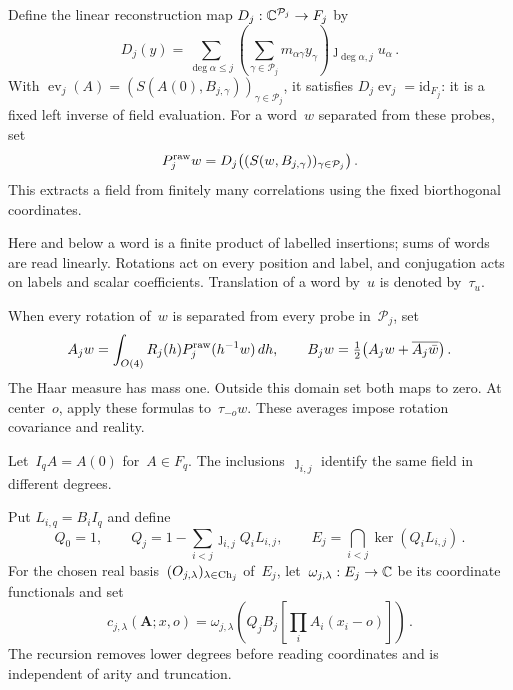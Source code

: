 \begin{definition}\label{def:D31}
Define the linear reconstruction map $D_j:\mathbb{C}^{\mathcal P_j}\to F_j$ by
\begin{equation*}
D_j(y)=\sum_{\deg\alpha\le j}\left(\sum_{\gamma\in\mathcal P_j}m_{\alpha\gamma}y_\gamma\right)\jmath_{\deg\alpha,j}u_\alpha\,.
\end{equation*}
With $\operatorname{ev}_j(A)=(S(A(0),B_{j,\gamma}))_{\gamma\in\mathcal P_j}$, it satisfies $D_j\operatorname{ev}_j=\mathrm{id}_{F_j}$: it is a fixed left inverse of field evaluation.
For a word~$w$ separated from these probes, set
\begin{equation*}
P_j^{\rm raw}w=D_j\big((S(w,B_{j,\gamma}))_{\gamma\in\mathcal P_j}\big)\,.
\end{equation*}
This extracts a field from finitely many correlations using the fixed biorthogonal coordinates.
\end{definition}

Here and below a word is a finite product of labelled insertions; sums of words are read linearly. Rotations act on every position and label, and conjugation acts on labels and scalar coefficients. Translation of a word by~$u$ is denoted by~$\tau_u$.

\begin{definition}\label{def:D32}
When every rotation of~$w$ is separated from every probe in~$\mathcal P_j$, set
\begin{equation*}
A_jw=\int_{O(4)}R_j(h)P_j^{\rm raw}(h^{-1}w)\,dh,\qquad
B_jw=\tfrac12\big(A_jw+\overline{A_j\bar w}\big)\,.
\end{equation*}
The Haar measure has mass one. Outside this domain set both maps to zero. At center~$o$, apply these formulas to~$\tau_{-o}w$. These averages impose rotation covariance and reality.
\end{definition}

Let~$I_qA=A(0)$ for~$A\in F_q$. The inclusions~$\jmath_{i,j}$ identify the same field in different degrees.

\begin{definition}\label{def:D33}
Put $L_{i,q}=B_iI_q$ and define
\begin{equation*}
Q_0=1,\qquad Q_j=1-\sum_{i<j}\jmath_{i,j}Q_iL_{i,j},\qquad
E_j=\bigcap_{i<j}\ker(Q_iL_{i,j})\,.
\end{equation*}
For the chosen real basis~$(O_{j,\lambda})_{\lambda\in\mathrm{Ch}_{j}}$ of~$E_j$, let~$\omega_{j,\lambda}:E_j\to\mathbb{C}$ be its coordinate functionals and set
\begin{equation*}
c_{j,\lambda}(\boldsymbol A;x,o)
=\omega_{j,\lambda}\!\left(Q_jB_j\!\left[\prod_i A_i(x_i-o)\right]\right)\,.
\end{equation*}
The recursion removes lower degrees before reading coordinates and is independent of arity and truncation.
\end{definition}

